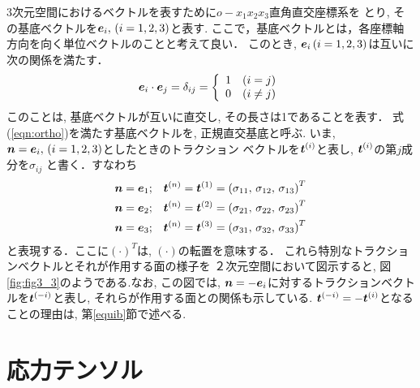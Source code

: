 \documentclass[10pt,a4j]{jarticle}
\begin{document}
3次元空間におけるベクトルを表すために$o-x_1x_2x_3$直角直交座標系を
とり, その基底ベクトルを$\mbox{\boldmath $e$}_i,\, (i=1,2,3)$と表す.
ここで，基底ベクトルとは，各座標軸方向を向く単位ベクトルのことと考えて良い．
このとき, $\mbox{\boldmath $e$}_i\, (i=1,2,3)$は互いに次の関係を満たす．
\begin{equation}
	\mbox{\boldmath $e$}_i\cdot \mbox{\boldmath $e$}_j=
	\delta_{ij}=
	\left\{
	\begin{array}{cc}
		1 & (i=j) \\
		0 & (i \neq j) \\
	\end{array}
	\right.
	\label{eqn:ortho}
\end{equation}
このことは, 基底ベクトルが互いに直交し, その長さは1であることを表す．
式(\ref{eqn:ortho})を満たす基底ベクトルを, 正規直交基底と呼ぶ.
いま, $\mbox{\boldmath $n$}=\mbox{\boldmath $e$}_i,\, (i=1,2,3)$としたときのトラクション
ベクトルを$\mbox{\boldmath $t$}^{(i)}$と表し, $\mbox{\boldmath $t$}^{(i)}$の第$j$成分を$\sigma_{ij}$
と書く．すなわち
\begin{eqnarray}
	\mbox{\boldmath $n$}=\mbox{\boldmath $e$}_1 &;& \mbox{\boldmath $t$}^{(n)}=\mbox{\boldmath $t$}^{(1)}
		=\left( \sigma_{11},\, \sigma_{12},\, \sigma_{13}\right)^T \\
	\mbox{\boldmath $n$}=\mbox{\boldmath $e$}_2 &;& \mbox{\boldmath $t$}^{(n)}=\mbox{\boldmath $t$}^{(2)} 
		=\left( \sigma_{21},\, \sigma_{22},\, \sigma_{23}\right)^T \\
	\mbox{\boldmath $n$}=\mbox{\boldmath $e$}_3 &;& \mbox{\boldmath $t$}^{(n)}=\mbox{\boldmath $t$}^{(3)} 
		=\left( \sigma_{31},\, \sigma_{32},\, \sigma_{33}\right)^T 
\end{eqnarray}
と表現する．ここに$(\cdot)^T$は, $(\cdot)$の転置を意味する．
これら特別なトラクションベクトルとそれが作用する面の様子を
２次元空間において図示すると, 図\ref{fig:fig3_3}のようである.なお, この図では, 
$\mbox{\boldmath $n$}=-\mbox{\boldmath $e$}_i$に対するトラクションベクトルを$\mbox{\boldmath $t$}^{(-i)}$と表し, 
それらが作用する面との関係も示している.
$\mbox{\boldmath $t$}^{(-i)}=-\mbox{\boldmath $t$}^{(i)}$となることの理由は, 第\ref{equib}節で述べる.
\section{応力テンソル}
\end{document}
